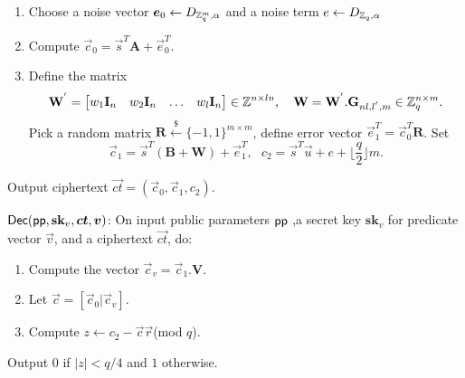 \begin{description}
\begin{enumerate}
\item Choose a noise vector $\boldsymbol{e}_{0}\leftarrow D_{\mathbb{Z}^{m}_{q},\alpha}$ and a noise term $e\leftarrow D_{\mathbb{Z}_{q},\alpha}$ 

\item Compute $\vec{c}_{0}=\vec{s}^{T}\textbf{A}+\vec{e}^{T}_{0}$.

\item Define the matrix
\begin{equation}
\textbf{W}^{'}= \begin{bmatrix}
w_{1} \textbf{I}_{n}&w_{2} \textbf{I}_{n}&\ldots&w_{l} \textbf{I}_{n}
\end{bmatrix} \in \mathbb{Z}^{n \times ln},~~~ \textbf{W}=\textbf{W}^{'}.\textbf{G}_{nl,l^{'},m} \in \mathbb{Z}^{n \times m}_{q}.
\end{equation}
Pick a random matrix $\textbf{R}\xleftarrow{\$} \{-1,1\}^{m \times m}$, define error vector $\vec{e}^{T}_{1}=\vec{c}^{T}_{0}\textbf{R}$. Set
\begin{equation}
\vec{c}_{1}=\vec{s}^{T}(\textbf{B}+\textbf{W})+\vec{e}^{T}_{1},~~~c_{2}=\vec{s}^{T}\vec{u}+e+\lfloor \frac{q}{2} \rfloor m.
\end{equation}
\end{enumerate}
Output ciphertext  $\vec{ct}=(\vec{c}_{0},\vec{c}_{1},c_{2})$.
\item $\mathsf{Dec}(\mathsf{pp},\textbf{sk}_{v},\boldsymbol{ct},\boldsymbol{v})$: On input public parameters $\mathsf{pp}$ ,a secret key $\textbf{sk}_{v}$ for predicate vector $\vec{v}$, and a ciphertext $\vec{ct}$, do:
\begin{enumerate}
\item Compute the vector $\vec{c}_{v}=\vec{c}_{1}.\textbf{V}$.

\item Let $\vec{c}=[\vec{c}_{0}|\vec{c}_{v}]$.

\item Compute $ z\leftarrow c_{2}-\vec{c}\vec{r}$(mod $q$).
\end{enumerate}
Output $0$ if $|z|<q/4$ and $1$ otherwise.

\end{description}

